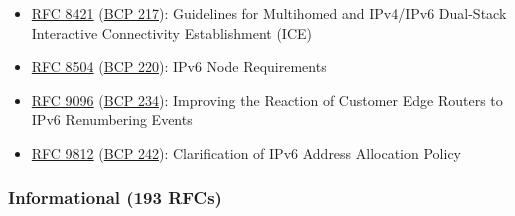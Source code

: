 \documentclass[
]{article}
\begin{document}
\begin{itemize}
\item
  \href{https://www.rfc-editor.org/info/rfc8421}{RFC 8421}
  (\href{https://www.rfc-editor.org/info/bcp217}{BCP 217}): Guidelines
  for Multihomed and IPv4/IPv6 Dual-Stack Interactive Connectivity
  Establishment (ICE)
\item
  \href{https://www.rfc-editor.org/info/rfc8504}{RFC 8504}
  (\href{https://www.rfc-editor.org/info/bcp220}{BCP 220}): IPv6 Node
  Requirements
\item
  \href{https://www.rfc-editor.org/info/rfc9096}{RFC 9096}
  (\href{https://www.rfc-editor.org/info/bcp234}{BCP 234}): Improving
  the Reaction of Customer Edge Routers to IPv6 Renumbering Events
\item
  \href{https://www.rfc-editor.org/info/rfc9812}{RFC 9812}
  (\href{https://www.rfc-editor.org/info/bcp242}{BCP 242}):
  Clarification of IPv6 Address Allocation Policy
\end{itemize}

\subsubsection{Informational (193 RFCs)}\label{informational-193-rfcs}
\end{document}
